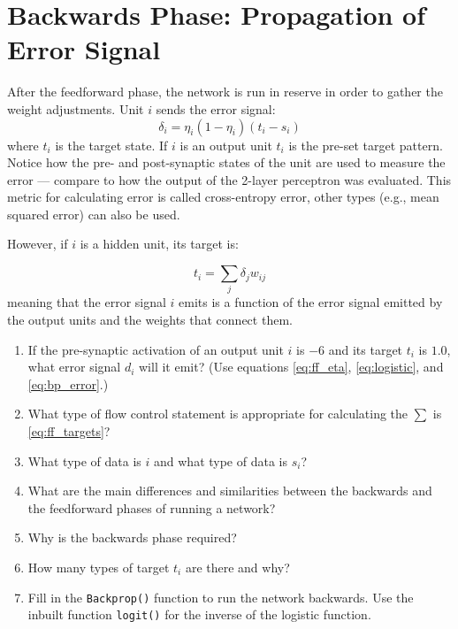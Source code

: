 \documentclass[a4paper,10pt]{article}
\begin{document}
\section{Backwards Phase: Propagation of Error Signal}
\label{sub:backwards_phase}
After the feedforward phase, the network is run in reserve in order to gather the weight adjustments. Unit $i$ sends the error signal:
\begin{equation}
  \delta_i = \eta_i (1 - \eta_i) (t_i - s_i)
\label{eq:bp_error}
\end{equation}
where $t_i$ is the target state. If $i$ is an output unit $t_i$ is the pre-set target pattern. Notice how the pre- and post-synaptic states of the unit are used to measure the error --- compare to how the output of the 2-layer perceptron was evaluated. This metric for calculating error is called cross-entropy error, other types (e.g., mean squared error) can also be used.

However, if $i$ is a hidden unit, its target is:

\begin{equation}
\label{eq:ff_targets}
  t_i = \sum_{j} \delta_j w_{ij} 
\end{equation}
meaning that the error signal $i$ emits is a function of the error signal emitted by the output units and the weights that connect them. 

\begin{enumerate}
 \item If the pre-synaptic activation of an output unit $i$ is $-6$ and its target $t_i$ is $1.0$, what error signal $d_i$ will it emit? (Use equations \ref{eq:ff_eta}, \ref{eq:logistic}, and \ref{eq:bp_error}.)
 
 \item What type of flow control statement is appropriate for calculating the $\sum$ is \autoref{eq:ff_targets}?
 
 \item What type of data is $i$ and what type of data is $s_i$?
 
 \item What are the main differences and similarities between the backwards and the feedforward phases of running a network?
 
 \item Why is the backwards phase required?
 
 \item How many types of target $t_i$ are there and why?
 
  \item Fill in the \texttt{Backprop()} function to run the network backwards. Use the inbuilt function \texttt{logit()} for the inverse of the logistic function.

 
 
 \end{enumerate}
\end{document}
